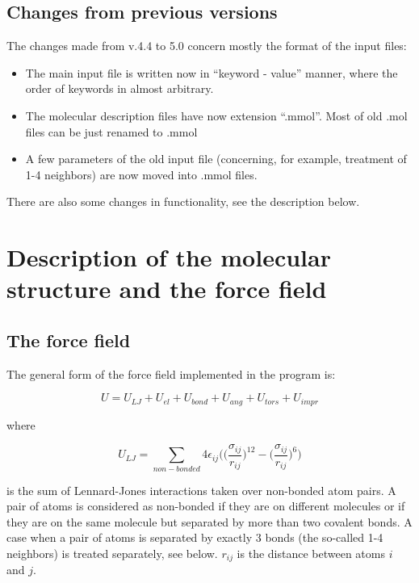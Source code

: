 \documentclass{article}
\begin{document}
\subsection{Changes from previous versions}

The changes made from v.4.4 to 5.0 concern mostly the format 
of the input files: 

\begin{itemize}
\item
The main input file is written now in ``keyword - value''
manner, where the order of keywords in almost arbitrary. 

\item
The molecular description files have now extension ``.mmol''. 
Most of old .mol files can be just renamed to .mmol

\item
A few parameters of the old input file (concerning, for example, 
treatment of 1-4 neighbors) are now moved into .mmol files.
\end{itemize}

There are also some changes in functionality, see the description below.

\section{Description of the molecular structure and the force field}

\subsection{The force field}

The general form of the force field implemented in the program is:

\begin{equation}
\label{FF}
U = U_{LJ} + U_{el} + U_{bond} + U_{ang} + U_{tors} + U_{impr}
\end{equation}

where

\begin{equation}
U_{LJ} = \sum_{non-bonded}4\epsilon_{ij}\Big(\big(\frac{
\sigma_{ij}}{r_{ij}}\big)^{12}-\big(\frac{\sigma_{ij}}{r_{ij}}\big)^6\Big)
\end{equation}

\noindent
is the sum of Lennard-Jones interactions taken over non-bonded atom
pairs. A pair of atoms is considered as non-bonded if they are on
different molecules or if they are on the same molecule but separated by more
than two covalent bonds. A case when a pair of atoms is separated by exactly 
3 bonds (the so-called 1-4 neighbors) is treated separately, see below.
$r_{ij}$ is the distance between atoms $i$ and $j$.
\end{document}
